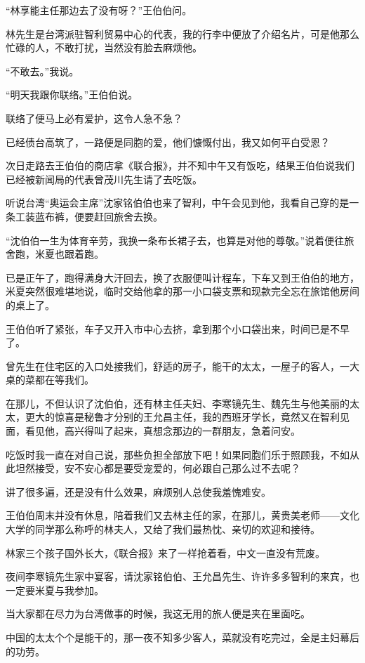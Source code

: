 \par “林享能主任那边去了没有呀？”王伯伯问。
\par 林先生是台湾派驻智利贸易中心的代表，我的行李中便放了介绍名片，可是他那么忙碌的人，不敢打扰，当然没有脸去麻烦他。
\par “不敢去。”我说。
\par “明天我跟你联络。”王伯伯说。
\par 联络了便马上必有爱护，这令人急不急？
\par 已经债台高筑了，一路便是同胞的爱，他们慷慨付出，我又如何平白受恩？
\par 次日走路去王伯伯的商店拿《联合报》，并不知中午又有饭吃，结果王伯伯说我们已经被新闻局的代表曾茂川先生请了去吃饭。
\par 听说台湾“奥运会主席”沈家铭伯伯也来了智利，中午会见到他，我看自己穿的是一条工装蓝布裤，便要赶回旅舍去换。
\par “沈伯伯一生为体育辛劳，我换一条布长裙子去，也算是对他的尊敬。”说着便往旅舍跑，米夏也跟着跑。
\par 已是正午了，跑得满身大汗回去，换了衣服便叫计程车，下车又到王伯伯的地方，米夏突然很难堪地说，临时交给他拿的那一小口袋支票和现款完全忘在旅馆他房间的桌上了。
\par 王伯伯听了紧张，车子又开入市中心去挤，拿到那个小口袋出来，时间已是不早了。
\par 曾先生在住宅区的入口处接我们，舒适的房子，能干的太太，一屋子的客人，一大桌的菜都在等我们。
\par 在那儿，不但认识了沈伯伯，还有林主任夫妇、李寒镜先生、魏先生与他美丽的太太，更大的惊喜是秘鲁才分别的王允昌主任，我的西班牙学长，竟然又在智利见面，看见他，高兴得叫了起来，真想念那边的一群朋友，急着问安。
\par 吃饭时我一直在对自己说，那些负担全部放下吧！如果同胞们乐于照顾我，不如从此坦然接受，安不安心都是要受宠爱的，何必跟自己那么过不去呢？
\par 讲了很多遍，还是没有什么效果，麻烦别人总使我羞愧难安。
\par 王伯伯周末并没有休息，陪着我们又去林主任的家，在那儿，黄贵美老师——文化大学的同学那么称呼的林夫人，又给了我们最热忱、亲切的欢迎和接待。
\par 林家三个孩子国外长大，《联合报》来了一样抢着看，中文一直没有荒废。
\par 夜间李寒镜先生家中宴客，请沈家铭伯伯、王允昌先生、许许多多智利的来宾，也一定要米夏与我参加。
\par 当大家都在尽力为台湾做事的时候，我这无用的旅人便是夹在里面吃。
\par 中国的太太个个是能干的，那一夜不知多少客人，菜就没有吃完过，全是主妇幕后的功劳。

